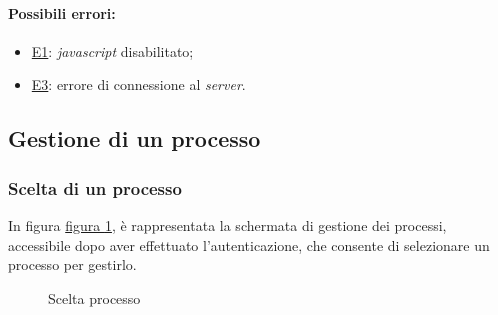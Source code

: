 \paragraph*{Possibili errori:}
\begin{itemize}
\item \hyperref[e1]{E1}: \textit{javascript} disabilitato;
\item \hyperref[e3]{E3}: errore di connessione al \textit{server}.
\end{itemize}


\subsection{Gestione di un processo}
\label{gestione}

\subsubsection{Scelta di un processo}

In figura \hyperref[fig:Fprocesses]{figura \ref{fig:Fprocesses}}, è rappresentata la schermata di gestione dei processi, accessibile dopo aver effettuato l'autenticazione, che consente di selezionare un processo per gestirlo.

\begin{figure}[H] \centering 
{} \caption{Scelta processo}
\label{fig:Fprocesses}
\end{figure}

